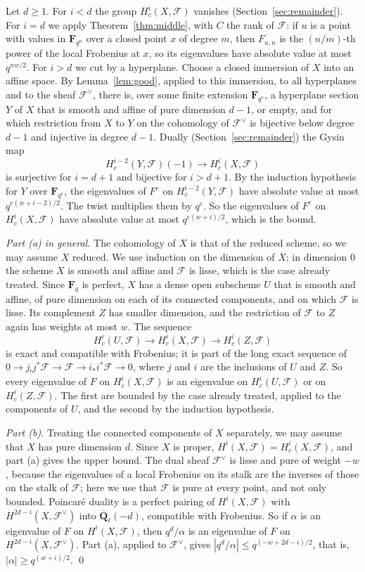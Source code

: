 \documentclass[11pt,a4paper]{article}
\theoremstyle{plain}
\theoremstyle{remark}
\newcommand{\Fq}{\mathbf F_q}
\newcommand{\Ql}{\overline{\mathbf Q}_\ell}
\newcommand{\F}{\mathcal F}
\begin{document}
Let $d\ge1$. For $i<d$ the group $H^i_c(X,\F)$ vanishes (Section~\ref{sec:remainder}). For $i=d$ we apply
Theorem~\ref{thm:middle}, with $C$ the rank of $\F$: if $u$ is a point with values in $\mathbf F_{q^n}$ over a closed
point $x$ of degree $m$, then $F_{u,n}$ is the $(n/m)$-th power of the local Frobenius at $x$, so its eigenvalues
have absolute value at most $q^{nw/2}$. For $i>d$ we cut by a hyperplane. Choose a closed immersion of $X$ into an
affine space. By Lemma~\ref{lem:good}, applied to this immersion, to all hyperplanes and to the sheaf $\F^\vee$,
there is, over some finite extension $\mathbf F_{q^{e}}$, a hyperplane section $Y$ of $X$ that is smooth and affine
of pure dimension $d-1$, or empty, and for which restriction from $X$ to $Y$ on the cohomology of $\F^\vee$ is
bijective below degree $d-1$ and injective in degree $d-1$. Dually (Section~\ref{sec:remainder}) the Gysin map
\[
H^{i-2}_c(Y,\F)(-1)\longrightarrow H^i_c(X,\F)
\]
is surjective for $i=d+1$ and bijective for $i>d+1$. By the induction hypothesis for $Y$ over $\mathbf F_{q^e}$, the
eigenvalues of $F^e$ on $H^{i-2}_c(Y,\F)$ have absolute value at most $q^{e(w+i-2)/2}$. The twist multiplies them by
$q^e$. So the eigenvalues of $F^e$ on $H^i_c(X,\F)$ have absolute value at most $q^{e(w+i)/2}$, which is the bound.

\medskip\noindent\emph{Part (a) in general.} The cohomology of $X$ is that of the reduced scheme, so we may assume
$X$ reduced. We use induction on the dimension of $X$; in dimension $0$ the scheme $X$ is smooth and affine and
$\F$ is lisse, which is the case already treated. Since $\Fq$ is perfect, $X$ has a dense open subscheme $U$ that is
smooth and affine, of pure dimension on each of its connected components, and on which $\F$ is lisse. Its complement
$Z$ has smaller dimension, and the restriction of $\F$ to $Z$ again has weights at most $w$. The sequence
\[
H^i_c(U,\F)\longrightarrow H^i_c(X,\F)\longrightarrow H^i_c(Z,\F)
\]
is exact and compatible with Frobenius; it is part of the long exact sequence of
$0\to j_!j^*\F\to\F\to i_*i^*\F\to0$, where $j$ and $i$ are the inclusions of $U$ and $Z$. So every eigenvalue of
$F$ on $H^i_c(X,\F)$ is an eigenvalue on $H^i_c(U,\F)$ or on $H^i_c(Z,\F)$. The first are bounded by the case
already treated, applied to the components of $U$, and the second by the induction hypothesis.

\medskip\noindent\emph{Part (b).} Treating the connected components of $X$ separately, we may assume that $X$ has
pure dimension $d$. Since $X$ is proper, $H^i(X,\F)=H^i_c(X,\F)$, and part (a) gives the upper bound. The dual sheaf
$\F^\vee$ is lisse and pure of weight $-w$, because the eigenvalues of a local Frobenius on its stalk are the
inverses of those on the stalk of $\F$; here we use that $\F$ is pure at every point, and not only bounded.
Poincar\'e duality is a perfect pairing of $H^i(X,\F)$ with $H^{2d-i}(X,\F^\vee)$ into $\Ql(-d)$, compatible with
Frobenius. So if $\alpha$ is an eigenvalue of $F$ on $H^i(X,\F)$, then $q^d/\alpha$ is an eigenvalue of $F$ on
$H^{2d-i}(X,\F^\vee)$. Part (a), applied to $\F^\vee$, gives $|q^d/\alpha|\le q^{(-w+2d-i)/2}$, that is,
$|\alpha|\ge q^{(w+i)/2}$. \qed
\end{document}
